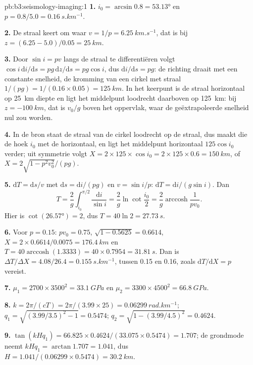 \begin{solution}{pb:b3:seismology-imaging:1}
\textbf{1.} $i_0 = \arcsin 0.8 = \ang{53.13}$ en $p = 0.8/5.0 =
\qty{0.16}{s.km^{-1}}$.

\textbf{2.} De straal keert om waar $v = 1/p = \qty{6.25}{km.s^{-1}}$, dat is bij
$z = (6.25 - 5.0)/0.05 = \qty{25}{km}$.

\textbf{3.} Door $\sin i = pv$ langs de straal te differentiëren volgt $\cos i\,\mathrm di/
\mathrm ds = pg\,\mathrm dz/\mathrm ds = pg\cos i$, dus $\mathrm di/\mathrm ds =
pg$: de richting draait met een constante snelheid, de kromming van een cirkel met straal
$1/(pg) = 1/(0.16\times0.05) = \qty{125}{km}$. In het keerpunt is de straal
horizontaal op \qty{25}{km} diepte en ligt het middelpunt loodrecht daarboven op
\qty{125}{km}: bij $z = \qty{-100}{km}$, dat is $v_0/g$ boven het oppervlak, waar de
geëxtrapoleerde snelheid nul zou worden.

\textbf{4.} In de bron staat de straal van de cirkel loodrecht op de straal, dus maakt
die de hoek $i_0$ met de horizontaal, en ligt het middelpunt horizontaal
$125\cos i_0$ verder; uit symmetrie volgt
$X = 2\times125\times\cos i_0 = 2\times125\times0.6 = \qty{150}{km}$, of
$X = 2\sqrt{1 - p^2v_0^2}/(pg)$.

\textbf{5.} $\mathrm dT = \mathrm ds/v$ met $\mathrm ds = \mathrm di/(pg)$ en
$v = \sin i/p$: $\mathrm dT = \mathrm di/(g\sin i)$. Dan
\[
  T = \frac2g\int_{i_0}^{\pi/2}\frac{\mathrm di}{\sin i} = \frac2g\ln\cot\frac{i_0}2 =
  \frac2g\operatorname{arccosh}\frac1{pv_0} .
\]
Hier is $\cot(\ang{26.57}) = 2$, dus
$T = 40\ln2 = \qty{27.73}{s}$.

\textbf{6.} Voor $p = 0.15$: $pv_0 = 0.75$, $\sqrt{1 - 0.5625} = 0.6614$,
$X = 2\times0.6614/0.0075 = \qty{176.4}{km}$ en $T = 40\operatorname{arccosh}
(1.3333) = 40\times0.7954 = \qty{31.81}{s}$. Dan is $\Delta T/\Delta X =
4.08/26.4 = \qty{0.155}{s.km^{-1}}$, tussen 0.15 en 0.16, zoals
$\mathrm dT/\mathrm dX = p$ vereist.

\textbf{7.} $\mu_1 = 2700\times3500^2 = \qty{33.1}{GPa}$ en
$\mu_2 = 3300\times4500^2 = \qty{66.8}{GPa}$.

\textbf{8.} $k = 2\pi/(cT) = 2\pi/(3.99\times25) = \qty{0.06299}{rad.km^{-1}}$;
$q_1 = \sqrt{(3.99/3.5)^2 - 1} = 0.5474$; $q_2 = \sqrt{1 - (3.99/4.5)^2} = 0.4624$.

\textbf{9.} $\tan(kHq_1) = 66.825\times0.4624/(33.075\times0.5474) = 1.707$; de
grondmode neemt $kHq_1 = \arctan1.707 = 1.041$, dus
$H = 1.041/(0.06299\times0.5474) = \qty{30.2}{km}$.


\end{solution}
